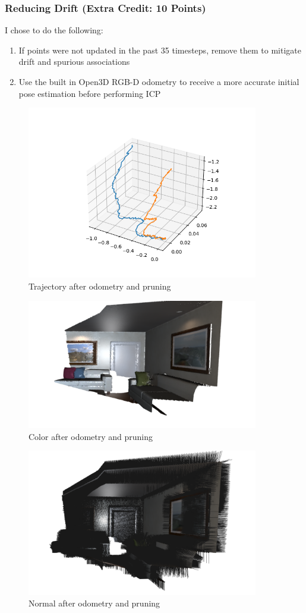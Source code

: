 \documentclass[12pt, a4paper]{article}
\begin{document}
\clearpage
\subsubsection{Reducing Drift (Extra Credit: 10 Points)}
I chose to do the following:
\begin{enumerate}
    \item If points were not updated in the past 35 timesteps, remove them to mitigate drift and spurious associations
    \item Use the built in Open3D RGB-D odometry to receive a more accurate initial pose estimation before performing ICP
\end{enumerate}


\begin{figure}
    \includegraphics[width=0.9\textwidth]{OdoAddition_Traj.png}
    \caption{Trajectory after odometry and pruning}
\end{figure}


\begin{figure}
    \includegraphics[width=0.9\textwidth]{a.png}
    \caption{Color after odometry and pruning}
\end{figure}

\begin{figure}
    \includegraphics[width=0.9\textwidth]{b.png}
    \caption{Normal after odometry and pruning}
\end{figure}
\end{document}
